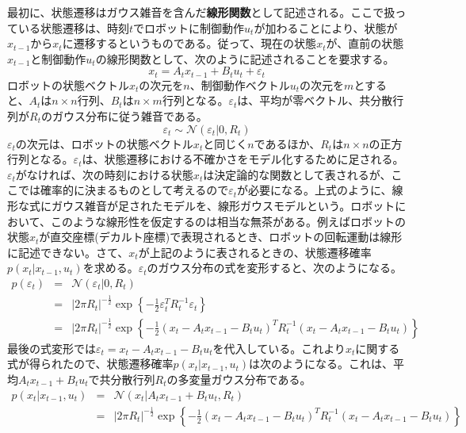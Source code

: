 \documentclass[dvipdfmx,a4paper]{jsarticle}
\begin{document}
最初に、状態遷移はガウス雑音を含んだ\textbf{線形関数}として記述される。ここで扱っている状態遷移は、時刻$t$でロボットに制御動作$u_t$が加わることにより、状態が$x_{t - 1}$から$x_t$に遷移するというものである。従って、現在の状態$x_t$が、直前の状態$x_{t - 1}$と制御動作$u_t$の線形関数として、次のように記述されることを要求する。
\begin{equation}
	x_t = A_t x_{t - 1} + B_t u_t + \varepsilon_t
\end{equation}
ロボットの状態ベクトル$x_t$の次元を$n$、制御動作ベクトル$u_t$の次元を$m$とすると、$A_t$は$n \times n$行列、$B_t$は$n \times m$行列となる。$\varepsilon_t$は、平均が零ベクトル、共分散行列が$R_t$のガウス分布に従う雑音である。
\begin{equation}
	\varepsilon_t \sim \mathcal{N}(\varepsilon_t | 0, R_t)
\end{equation}
$\varepsilon_t$の次元は、ロボットの状態ベクトル$x_t$と同じく$n$であるほか、$R_t$は$n \times n$の正方行列となる。$\varepsilon_t$は、状態遷移における不確かさをモデル化するために足される。$\varepsilon_t$がなければ、次の時刻における状態$x_t$は決定論的な関数として表されるが、ここでは確率的に決まるものとして考えるので$\varepsilon_t$が必要になる。上式のように、線形な式にガウス雑音が足されたモデルを、線形ガウスモデルという。ロボットにおいて、このような線形性を仮定するのは相当な無茶がある。例えばロボットの状態$x_t$が直交座標(デカルト座標)で表現されるとき、ロボットの回転運動は線形に記述できない。さて、$x_t$が上記のように表されるときの、状態遷移確率$p(x_t | x_{t - 1}, u_t)$を求める。$\varepsilon_t$のガウス分布の式を変形すると、次のようになる。
\begin{eqnarray}
	p(\varepsilon_t) &=& \mathcal{N}(\varepsilon_t | 0, R_t) \nonumber \\
	&=& |2 \pi R_t|^{-\frac{1}{2}} \exp \left\{ -\frac{1}{2} \varepsilon_t^T R_t^{-1} \varepsilon_t \right\} \nonumber \\
	&=& |2 \pi R_t|^{-\frac{1}{2}} \exp \left\{ -\frac{1}{2} \left( x_t - A_t x_{t - 1} - B_t u_t \right)^T R_t^{-1} \left( x_t - A_t x_{t - 1} - B_t u_t \right) \right\}
\end{eqnarray}
最後の式変形では$\varepsilon_t = x_t - A_t x_{t - 1} - B_t u_t$を代入している。これより$x_t$に関する式が得られたので、状態遷移確率$p(x_t | x_{t - 1}, u_t)$は次のようになる。これは、平均$A_t x_{t - 1} + B_t u_t$で共分散行列$R_t$の多変量ガウス分布である。
\begin{eqnarray}
	p(x_t | x_{t - 1}, u_t) &=& \mathcal{N}(x_t | A_t x_{t - 1} + B_t u_t, R_t) \\
	&=& |2 \pi R_t|^{-\frac{1}{2}} \exp \left\{ -\frac{1}{2} \left( x_t - A_t x_{t - 1} - B_t u_t \right)^T R_t^{-1} \left( x_t - A_t x_{t - 1} - B_t u_t \right) \right\}
\end{eqnarray}
\end{document}
